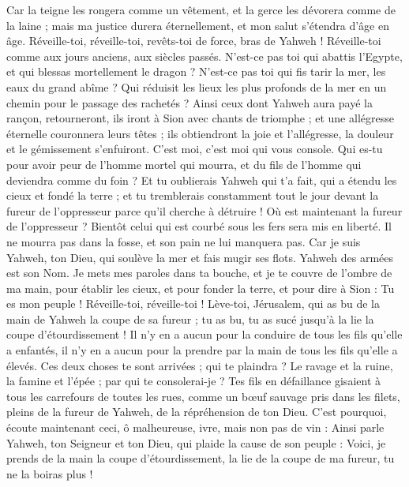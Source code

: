 \begin{multicols}{2}
Car la teigne les rongera comme un vêtement, et la gerce les dévorera comme de la laine ; mais ma justice durera éternellement, et mon salut s'étendra d'âge en âge.
Réveille-toi, réveille-toi, revêts-toi de force, bras de Yahweh ! Réveille-toi comme aux jours anciens, aux siècles passés. N'est-ce pas toi qui abattis l'Egypte, et qui blessas mortellement le dragon ?
N'est-ce pas toi qui fis tarir la mer, les eaux du grand abîme ? Qui réduisit les lieux les plus profonds de la mer en un chemin pour le passage des rachetés ?
Ainsi ceux dont Yahweh aura payé la rançon, retourneront, ils iront à Sion avec chants de triomphe ; et une allégresse éternelle couronnera leurs têtes ; ils obtiendront la joie et l'allégresse, la douleur et le gémissement s'enfuiront.
C'est moi, c'est moi qui vous console. Qui es-tu pour avoir peur de l'homme mortel qui mourra, et du fils de l'homme qui deviendra comme du foin ?
Et tu oublierais Yahweh qui t'a fait, qui a étendu les cieux et fondé la terre ; et tu tremblerais constamment tout le jour devant la fureur de l'oppresseur parce qu'il cherche à détruire ! Où est maintenant la fureur de l'oppresseur ?
Bientôt celui qui est courbé sous les fers sera mis en liberté. Il ne mourra pas dans la fosse, et son pain ne lui manquera pas.
Car je suis Yahweh, ton Dieu, qui soulève la mer et fais mugir ses flots. Yahweh des armées est son Nom.
Je mets mes paroles dans ta bouche, et je te couvre de l'ombre de ma main, pour établir les cieux, et pour fonder la terre, et pour dire à Sion : Tu es mon peuple !
Réveille-toi, réveille-toi ! Lève-toi, Jérusalem, qui as bu de la main de Yahweh la coupe de sa fureur ; tu as bu, tu as sucé jusqu'à la lie la coupe d'étourdissement !
Il n'y en a aucun pour la conduire de tous les fils qu'elle a enfantés, il n'y en a aucun pour la prendre par la main de tous les fils qu'elle a élevés.
Ces deux choses te sont arrivées ; qui te plaindra ? Le ravage et la ruine, la famine et l'épée ; par qui te consolerai-je ?
Tes fils en défaillance gisaient à tous les carrefours de toutes les rues, comme un bœuf sauvage pris dans les filets, pleins de la fureur de Yahweh, de la répréhension de ton Dieu.
C'est pourquoi, écoute maintenant ceci, ô malheureuse, ivre, mais non pas de vin :
Ainsi parle Yahweh, ton Seigneur et ton Dieu, qui plaide la cause de son peuple : Voici, je prends de la main la coupe d'étourdissement, la lie de la coupe de ma fureur, tu ne la boiras plus !

\end{multicols}
